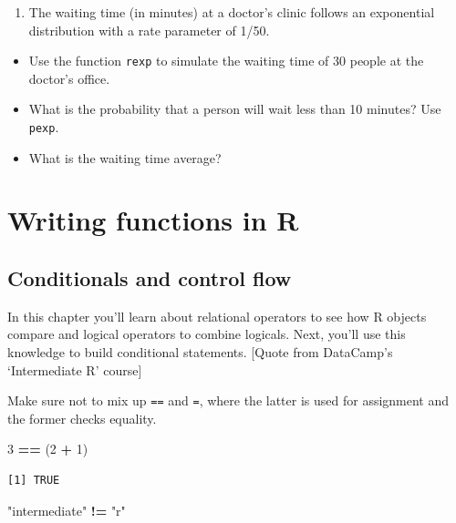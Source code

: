 \documentclass[
]{book}
\newenvironment{Shaded}{\begin{snugshade}}{\end{snugshade}}
\newcommand{\DecValTok}[1]{\textcolor[rgb]{0.00,0.00,0.81}{#1}}
\newcommand{\NormalTok}[1]{#1}
\newcommand{\OperatorTok}[1]{\textcolor[rgb]{0.81,0.36,0.00}{\textbf{#1}}}
\newcommand{\StringTok}[1]{\textcolor[rgb]{0.31,0.60,0.02}{#1}}
\providecommand{\tightlist}{%
  \setlength{\itemsep}{0pt}\setlength{\parskip}{0pt}}
\begin{document}
\begin{enumerate}
\def\labelenumi{\arabic{enumi}.}
\setcounter{enumi}{2}
\tightlist
\item
  The waiting time (in minutes) at a doctor's clinic follows an exponential distribution with a rate parameter of 1/50.
\end{enumerate}

\begin{itemize}
\tightlist
\item
  Use the function \texttt{rexp} to simulate the waiting time of 30 people at the doctor's office.
\item
  What is the probability that a person will wait less than 10 minutes? Use \texttt{pexp}.
\item
  What is the waiting time average?
\end{itemize}

\hypertarget{functions}{%
\chapter{Writing functions in R}\label{functions}}

\hypertarget{conditionals-and-control-flow}{%
\section{Conditionals and control flow}\label{conditionals-and-control-flow}}

In this chapter you'll learn about relational operators to see how R objects compare and logical operators to combine logicals. Next, you'll use this knowledge to build conditional statements. {[}Quote from DataCamp's `Intermediate R' course{]}

Make sure not to mix up \texttt{==} and \texttt{=}, where the latter is used for assignment and the former checks equality.

\begin{Shaded}
\begin{Highlighting}[]
\DecValTok{3} \OperatorTok{==}\StringTok{ }\NormalTok{(}\DecValTok{2} \OperatorTok{+}\StringTok{ }\DecValTok{1}\NormalTok{)}
\end{Highlighting}
\end{Shaded}

\begin{verbatim}
[1] TRUE
\end{verbatim}

\begin{Shaded}
\begin{Highlighting}[]
\StringTok{"intermediate"} \OperatorTok{!=}\StringTok{ "r"}
\end{Highlighting}
\end{Shaded}
\end{document}
